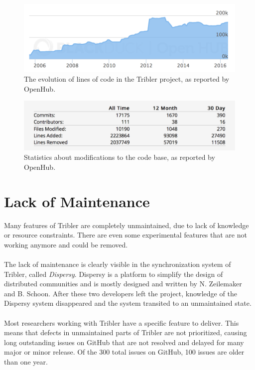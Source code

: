 \begin{figure}[!h]
	\centering
	\includegraphics[width=\columnwidth]{images/openhub_loc}
	\caption{The evolution of lines of code in the Tribler project, as reported by OpenHub.}
	\label{fig:openhub-loc}
\end{figure}

\begin{figure}[!h]
	\centering
	\includegraphics[width=0.8\columnwidth]{images/openhub_commits_table}
	\caption{Statistics about modifications to the code base, as reported by OpenHub.}
	\label{fig:openhub-commit-stats}
\end{figure}

\section{Lack of Maintenance}
Many features of Tribler are completely unmaintained, due to lack of knowledge or resource constraints. There are even some experimental features that are not working anymore and could be removed.\\\\
The lack of maintenance is clearly visible in the synchronization system of Tribler, called \emph{Dispersy}. Dispersy is a platform to simplify the design of distributed communities and is mostly designed and written by
N. Zeilemaker and B. Schoon\cite{zeilemaker2013dispersy}. After these two developers left the project, knowledge of the Dispersy system disappeared and the system transited to an unmaintained state.\\\\
Most researchers working with Tribler have a specific feature to deliver. This means that defects in unmaintained parts of Tribler are not prioritized, causing long outstanding issues on GitHub that are not resolved and delayed for many major or minor release. Of the 300 total issues on GitHub, 100 issues are older than one year.
 
